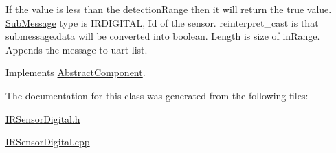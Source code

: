 If the value is less than the detection\+Range then it will return the true value. \hyperlink{struct_sub_message}{Sub\+Message} type is I\+R\+D\+I\+G\+I\+T\+AL, Id of the sensor. reinterpret\+\_\+cast is that submessage.\+data will be converted into boolean. Length is size of in\+Range. Appends the message to uart list. 

Implements \hyperlink{class_abstract_component_af25a90b8ab213762221c3b358d9873f3}{Abstract\+Component}.



The documentation for this class was generated from the following files\+:\begin{DoxyCompactItemize}
\item 
\hyperlink{_i_r_sensor_digital_8h}{I\+R\+Sensor\+Digital.\+h}\item 
\hyperlink{_i_r_sensor_digital_8cpp}{I\+R\+Sensor\+Digital.\+cpp}\end{DoxyCompactItemize}
